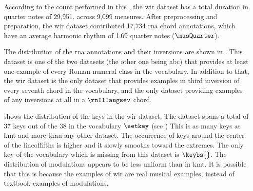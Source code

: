 
According to the count performed in this \thesisdiss{}, the
\gls{wir} dataset has a total duration in quarter notes of
29,951, across 9,099 measures. After preprocessing and
preparation, the \gls{wir} dataset contributed 17,734
\gls{rna} chord annotations, which have an average harmonic
rhythm of 1.69 quarter notes ($\musQuarter$).

The distribution of the \gls{rna} annotations and their
inversions are shown in . This
dataset is one of the two datasets (the other one being
\gls{abc}) that provides at least one example of every Roman
numeral class in the vocabulary. In addition to that, the
\gls{wir} dataset is the only dataset that provides examples
in third inversion of every seventh chord in the vocabulary,
and the only dataset providing examples of any inversions at
all in a $\rnIIIaugsev$ chord.



 shows the distribution of the keys
in the \gls{wir} dataset. The dataset spans a total of 37
keys out of the 38 in the vocabulary $\setkey$ (see ) This is as many keys
as \gls{kmt} and more than any other dataset. The occurrence
of keys around the center of the \gls{lineoffifths} is
higher and it slowly smooths toward the extremes. The only
key of the vocabulary which is missing from this dataset is
$\keybs{}$. The distribution of modulations appears to be less
uniform than in \gls{kmt}. It is possible that this is
because the examples of \gls{wir} are real musical examples,
instead of textbook examples of modulations.
